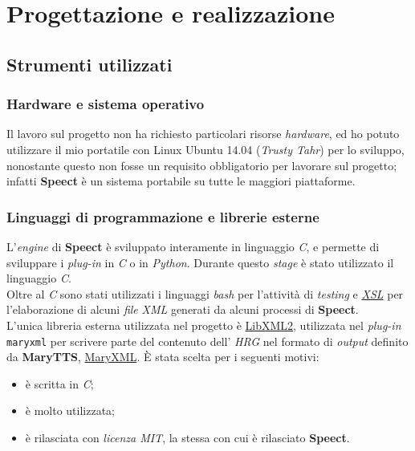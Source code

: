 
\chapter{Progettazione e realizzazione}
\label{cap:progettazione-realizzazione}



\section{Strumenti utilizzati}
  \subsection{Hardware e sistema operativo}	  
    Il lavoro sul progetto non ha richiesto particolari risorse \textit{hardware}, ed ho potuto	
    utilizzare il mio portatile con Linux Ubuntu 14.04 (\textit{Trusty Tahr}) per lo sviluppo, nonostante questo
    non fosse un requisito obbligatorio per lavorare sul progetto; infatti \textbf{Speect} è un sistema portabile
    su tutte le maggiori piattaforme.
  \subsection{Linguaggi di programmazione e librerie esterne}
   L'\textit{engine} di \textbf{Speect} è sviluppato interamente in linguaggio \textit{C}, e permette di sviluppare i \textit{plug-in}
   in \textit{C} o in \textit{Python}. Durante questo \textit{stage} è stato utilizzato il linguaggio \textit{C}. \\
   Oltre al \textit{C} sono stati utilizzati i linguaggi \textit{bash} per l'attività di \textit{testing} e \hyperref[glo:xsl]{\emph{XSL}\glsfirstoccur}
   per l'elaborazione
   di alcuni \textit{file} \textit{XML} generati da alcuni processi di \textbf{Speect}. \\ 
   L'unica libreria esterna utilizzata nel progetto è \href{http://xmlsoft.org/}{LibXML2}, utilizzata nel \textit{plug-in} 
   \texttt{maryxml} per scrivere parte del contenuto dell' \textit{HRG} nel formato di \textit{output} definito 
   da \textbf{MaryTTS}, \href{http://mary.dfki.de/documentation/maryxml/}{MaryXML}. È stata scelta per i seguenti motivi:
   \begin{itemize}
      \item è scritta in \textit{C};
      \item è molto utilizzata;
      \item è rilasciata con \textit{licenza MIT}, la stessa con cui è rilasciato \textbf{Speect}.
   \end{itemize}

